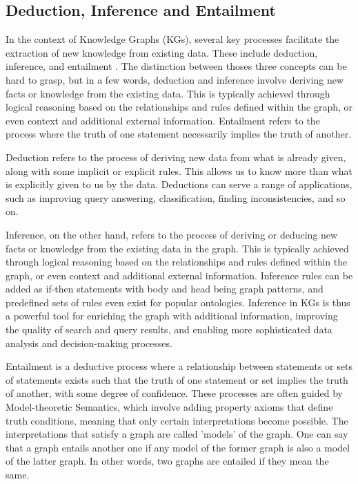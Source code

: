 \documentclass[11pt]{article} %
\begin{document}
\subsection{Deduction, Inference and Entailment}

In the context of Knowledge Graphs (KGs), several key processes facilitate the extraction of new knowledge from existing data. These include deduction, inference, and entailment \cite{KG21}. The distinction between thoses three concepts can be hard to grasp, but in a few words, deduction and inference involve deriving new facts or knowledge from the existing data. This is typically achieved through logical reasoning based on the relationships and rules defined within the graph, or even context and additional external information. Entailment refers to the process where the truth of one statement necessarily implies the truth of another.

Deduction refers to the process of deriving new data from what is already given, along with some implicit or explicit rules. This allows us to know more than what is explicitly given to us by the data. Deductions can serve a range of applications, such as improving query answering, classification, finding inconsistencies, and so on.

Inference, on the other hand, refers to the process of deriving or deducing new facts or knowledge from the existing data in the graph. This is typically achieved through logical reasoning based on the relationships and rules defined within the graph, or even context and additional external information. Inference rules can be added as if-then statements with body and head being graph patterns, and predefined sets of rules even exist for popular ontologies. Inference in KGs is thus a powerful tool for enriching the graph with additional information, improving the quality of search and query results, and enabling more sophisticated data analysis and decision-making processes. 

Entailment is a deductive process where a relationship between statements or sets of statements exists such that the truth of one statement or set implies the truth of another, with some degree of confidence.  These processes are often guided by Model-theoretic Semantics, which involve adding property axioms that define truth conditions, meaning that only certain interpretations become possible. The interpretations that satisfy a graph are called 'models' of the graph. One can say that a graph entails another one if any model of the former graph is also a model of the latter graph. In other words, two graphs are entailed if they mean the same.
\end{document}
